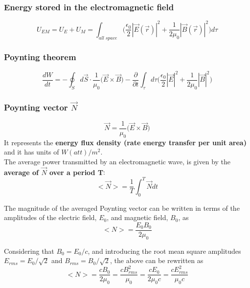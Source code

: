 \documentclass[english,11pt]{article}
\begin{document}
\subsubsection*{\bf Energy stored in the electromagnetic field}

\begin{equation*}
   U_{EM} = U_{E} + U_{M} = \int_{all\;space} \Big(
     \frac{\epsilon_0}{2} |\vec{E}(\vec{r})|^2 + \frac{1}{2\mu_{0}} |\vec{B}(\vec{r})|^2
     \Big) d\tau
\end{equation*}


\subsubsection*{\bf Poynting theorem}

\begin{equation*}
  \frac{dW}{dt} =
     - \oint_{S} d\vec{S} \cdot \frac{1}{\mu_0} \Big(\vec{E} \times \vec{B} \Big)
     - \frac{\partial}{\partial t} \int_{\tau} d\tau  \Big( \frac{\epsilon_0}{2} |\vec{E}|^2 + \frac{1}{2\mu_0} |\vec{B}|^2 \Big)
\end{equation*}


\subsubsection*{\bf Poynting vector $\vec{N}$}

\begin{equation*}
  \vec{N} = \frac{1}{\mu_0} \Big( \vec{E} \times \vec{B} \Big)
\end{equation*}
It represents the {\bf energy flux density (rate energy transfer per unit area)} and it has units of $W(att)/m^2$.\\

The average power transmitted by an electromagnetic wave, is given by
the {\bf average of $\vec{N}$ over a period T}:
\begin{equation*}
  <\vec{N}> = \frac{1}{T} \int_{0}^{T} \vec{N} dt
\end{equation*}

The magnitude of the averaged Poynting vector
can be written in terms of the amplitudes of the electric field,
$E_0$, and magnetic field, $B_0$, as
\begin{equation*}
  <N> = \frac{E_0 B_0}{2 \mu_0}
\end{equation*}

Considering that $B_0 = E_0/c$, and introducing the root mean square
amplitudes $E_{rms}=E_0/\sqrt{2}$ and $B_{rms}=B_0/\sqrt{2}$,
the above can be rewritten  as
\begin{equation*}
  <N> =
  \frac{c B_0}{2 \mu_0} =
  \frac{c B_{rms}^2}{\mu_0} =
  \frac{c E_0}{2 \mu_0 c} =
  \frac{c E_{rms}^2}{\mu_0 c}
\end{equation*}
\end{document}
